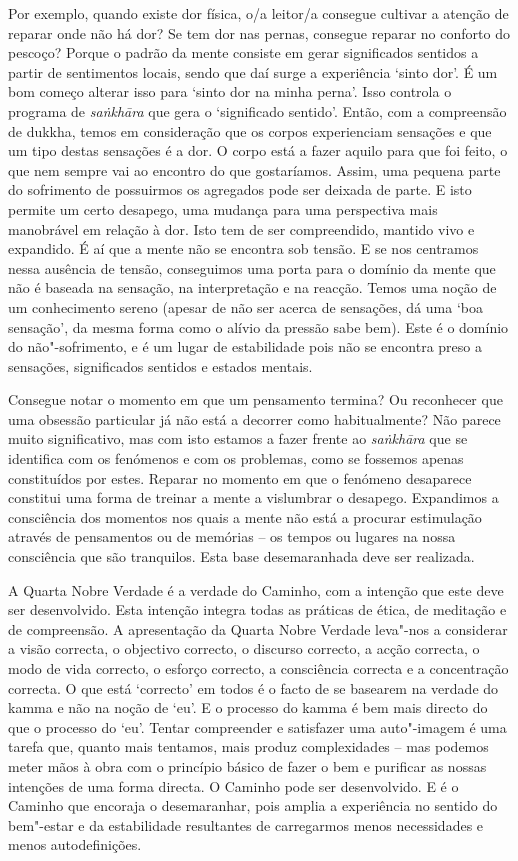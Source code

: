 Por exemplo, quando existe dor física, o/a leitor/a consegue cultivar a atenção
de reparar onde não há dor? Se tem dor nas pernas, consegue reparar no conforto
do pescoço? Porque o padrão da mente consiste em gerar significados sentidos a
partir de sentimentos locais, sendo que daí surge a experiência `sinto dor'. É
um bom começo alterar isso para `sinto dor na minha perna'. Isso controla o
programa de \emph{saṅkhāra} que gera o `significado sentido'. Então, com a
compreensão de dukkha, temos em consideração que os corpos experienciam
sensações e que um tipo destas sensações é a dor. O corpo está a fazer aquilo
para que foi feito, o que nem sempre vai ao encontro do que gostaríamos. Assim,
uma pequena parte do sofrimento de possuirmos os agregados pode ser deixada de
parte. E isto permite um certo desapego, uma mudança para uma perspectiva mais
manobrável em relação à dor. Isto tem de ser compreendido, mantido vivo e
expandido. É aí que a mente não se encontra sob tensão. E se nos centramos nessa
ausência de tensão, conseguimos uma porta para o domínio da mente que não é
baseada na sensação, na interpretação e na reacção. Temos uma noção de um
conhecimento sereno (apesar de não ser acerca de sensações, dá uma `boa
sensação', da mesma forma como o alívio da pressão sabe bem). Este é o domínio
do não"-sofrimento, e é um lugar de estabilidade pois não se encontra preso a
sensações, significados sentidos e estados mentais.

Consegue notar o momento em que um pensamento termina? Ou reconhecer que uma
obsessão particular já não está a decorrer como habitualmente? Não parece muito
significativo, mas com isto estamos a fazer frente ao \emph{saṅkhāra} que se
identifica com os fenómenos e com os problemas, como se fossemos apenas
constituídos por estes. Reparar no momento em que o fenómeno desaparece
constitui uma forma de treinar a mente a vislumbrar o desapego. Expandimos a
consciência dos momentos nos quais a mente não está a procurar estimulação
através de pensamentos ou de memórias -- os tempos ou lugares na nossa
consciência que são tranquilos. Esta base desemaranhada deve ser realizada.

A Quarta Nobre Verdade é a verdade do Caminho, com a intenção que este deve ser
desenvolvido. Esta intenção integra todas as práticas de ética, de meditação e
de compreensão. A apresentação da Quarta Nobre Verdade leva"-nos a considerar a
visão correcta, o objectivo correcto, o discurso correcto, a acção correcta, o
modo de vida correcto, o esforço correcto, a consciência correcta e a
concentração correcta. O que está `correcto' em todos é o facto de se basearem
na verdade do kamma e não na noção de `eu'. E o processo do kamma é bem mais
directo do que o processo do `eu'. Tentar compreender e satisfazer uma
auto"-imagem é uma tarefa que, quanto mais tentamos, mais produz complexidades
-- mas podemos meter mãos à obra com o princípio básico de fazer o bem e
purificar as nossas intenções de uma forma directa. O Caminho pode ser
desenvolvido. E é o Caminho que encoraja o desemaranhar, pois amplia a
experiência no sentido do bem"-estar e da estabilidade resultantes de
carregarmos menos necessidades e menos autodefinições.

